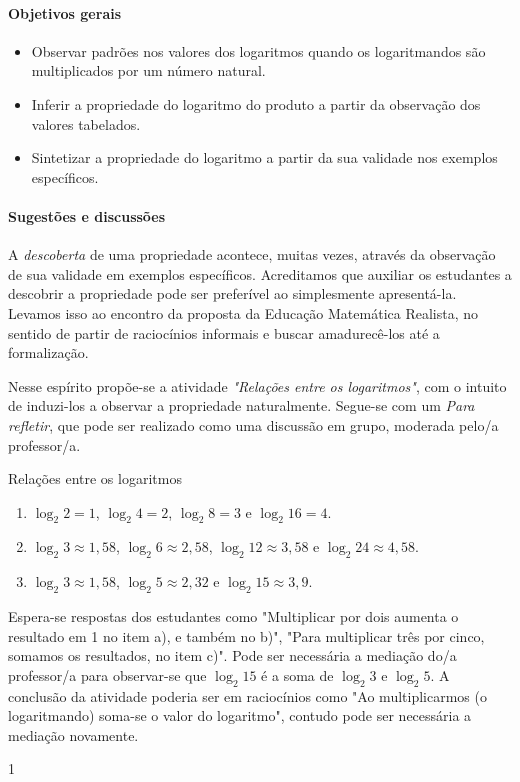 \clearpage
\def\currentcolor{session1}
\begin{texto}
{
	\paragraph{Objetivos gerais}
	\begin{itemize}
	\item Observar padrões nos valores dos logaritmos quando os logaritmandos são multiplicados por um número natural.
	\item Inferir a propriedade do logaritmo do produto a partir da observação dos valores tabelados.
	\item Sintetizar a propriedade do logaritmo a partir da sua validade nos exemplos específicos.
	\end{itemize}

	\paragraph{Sugestões e discussões}

	A \textit{descoberta} de uma propriedade acontece, muitas vezes, através da observação de sua validade em exemplos específicos. Acreditamos que auxiliar os estudantes a descobrir a propriedade pode ser preferível ao simplesmente apresentá-la. Levamos isso ao encontro da proposta da Educação Matemática Realista, no sentido de partir de raciocínios informais e buscar amadurecê-los até a formalização.

	Nesse espírito propõe-se a atividade \textit{"Relações entre os logaritmos"}, com o intuito de induzi-los a observar a propriedade naturalmente. Segue-se com um \textit{Para refletir}, que pode ser realizado como uma discussão em grupo, moderada pelo/a professor/a.
	\vspace{2em}
}
\end{texto}
\begin{answer}{Relações entre os logaritmos}
{
	\begin{enumerate}
	\item $\log_2 2 = 1$, $\log_2 4 = 2$, $\log_2 8 = 3$ e $\log_2 16 = 4$.
	\item $\log_2 3 \approx 1{,}58$, $\log_2 6 \approx 2{,}58$, $\log_2 12 \approx 3{,}58$ e $\log_2 24 \approx 4{,}58$.
	\item $\log_2 3 \approx 1{,}58$, $\log_2 5 \approx 2{,}32$ e $\log_2 15 \approx 3{,}9$.
	\end{enumerate}


	Espera-se respostas dos estudantes como "Multiplicar por dois aumenta o resultado em 1 no item a), e também no b)", "Para multiplicar três por cinco, somamos os resultados, no item c)". Pode ser necessária a mediação do/a professor/a para observar-se que $\log _2 15$ é a soma de $\log _2 3$ e $\log _2 5$. A conclusão da atividade poderia ser em raciocínios como "Ao multiplicarmos (o logaritmando) soma-se o valor do logaritmo", contudo pode ser necessária a mediação novamente.
}{1}
\end{answer}
